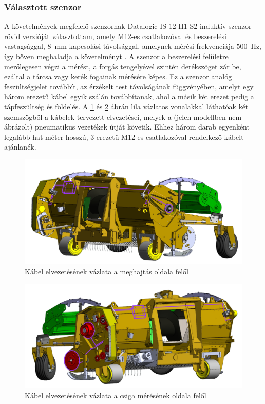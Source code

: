 \subsubsection{Választott szenzor}

A követelmények megfelelő szenzornak Datalogic IS-12-H1-S2 induktív szenzor rövid verzióját választottam, amely M12-es csatlakozóval és beszerelési vastagsággal, $8$~mm kapcsolási távolsággal, amelynek mérési frekvenciája $500$~Hz, így bőven meghaladja a követelményt \cite{datalogic_catalog}. A szenzor a beszerelési felületre merőlegesen végzi a mérést, a forgás tengelyével szintén derékszöget zár be, ezáltal a tárcsa vagy kerék fogainak mérésére képes. Ez a szenzor analóg feszültségjelet továbbít, az érzékelt test távolságának függvényében, amelyt egy három erezetű kábel egyik szálán továbbítanak, ahol a másik két erezet pedig a tápfeszültség és földelés. A \ref{kabelezes_1} és \ref{kabelezes_2} ábrán lila vázlatos vonalakkal láthatóak két szemszögből a kábelek tervezett elvezetései, melyek a (jelen modellben nem ábrázolt) pneumatikus vezetékek útját követik. Ehhez három darab egyenként legalább hat méter hosszú, 3 erezetű M12-es csatlakozóval rendelkező kábelt ajánlanék.
\begin{figure}
	\centering
	\includegraphics[width=\columnwidth*6/10]{figures/rajzolt_kabelezes_1.jpg}
	\caption{Kábel elvezetésének vázlata a meghajtás oldala felől}
	\label{kabelezes_1}
\end{figure}
\begin{figure}
	\centering
	\includegraphics[width=\columnwidth*6/10]{figures/rajzolt_kabelezes_2.jpg}
	\caption{Kábel elvezetésének vázlata a csiga mérésének oldala felől}
	\label{kabelezes_2}
\end{figure}

